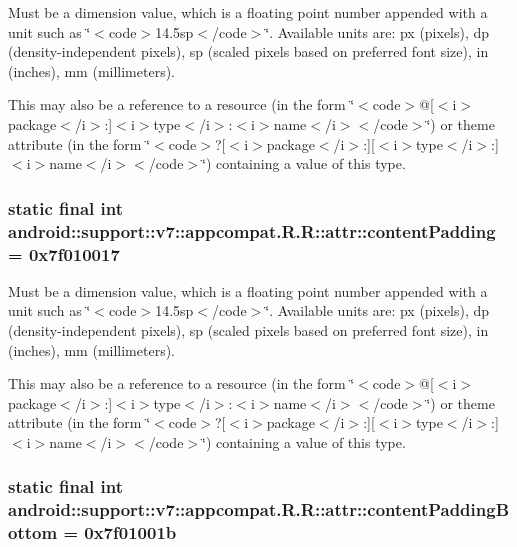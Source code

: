 Must be a dimension value, which is a floating point number appended with a unit such as \char`\"{}$<$code$>$14.5sp$<$/code$>$\char`\"{}. Available units are: px (pixels), dp (density-independent pixels), sp (scaled pixels based on preferred font size), in (inches), mm (millimeters). 

This may also be a reference to a resource (in the form \char`\"{}$<$code$>$@\mbox{[}$<$i$>$package$<$/i$>$:\mbox{]}$<$i$>$type$<$/i$>$:$<$i$>$name$<$/i$>$$<$/code$>$\char`\"{}) or theme attribute (in the form \char`\"{}$<$code$>$?\mbox{[}$<$i$>$package$<$/i$>$:\mbox{]}\mbox{[}$<$i$>$type$<$/i$>$:\mbox{]}$<$i$>$name$<$/i$>$$<$/code$>$\char`\"{}) containing a value of this type. \hypertarget{classandroid_1_1support_1_1v7_1_1appcompat_1_1_r_1_1attr_b21cc6fefb329f4e67d140c836cede25}{
\subsubsection[{contentPadding}]{\setlength{\rightskip}{0pt plus 5cm}static final int android::support::v7::appcompat.R.R::attr::contentPadding = 0x7f010017}}
\label{classandroid_1_1support_1_1v7_1_1appcompat_1_1_r_1_1attr_b21cc6fefb329f4e67d140c836cede25}


Must be a dimension value, which is a floating point number appended with a unit such as \char`\"{}$<$code$>$14.5sp$<$/code$>$\char`\"{}. Available units are: px (pixels), dp (density-independent pixels), sp (scaled pixels based on preferred font size), in (inches), mm (millimeters). 

This may also be a reference to a resource (in the form \char`\"{}$<$code$>$@\mbox{[}$<$i$>$package$<$/i$>$:\mbox{]}$<$i$>$type$<$/i$>$:$<$i$>$name$<$/i$>$$<$/code$>$\char`\"{}) or theme attribute (in the form \char`\"{}$<$code$>$?\mbox{[}$<$i$>$package$<$/i$>$:\mbox{]}\mbox{[}$<$i$>$type$<$/i$>$:\mbox{]}$<$i$>$name$<$/i$>$$<$/code$>$\char`\"{}) containing a value of this type. \hypertarget{classandroid_1_1support_1_1v7_1_1appcompat_1_1_r_1_1attr_83c13e0c0ea42b6b41e092a2805d4531}{
\subsubsection[{contentPaddingBottom}]{\setlength{\rightskip}{0pt plus 5cm}static final int android::support::v7::appcompat.R.R::attr::contentPaddingBottom = 0x7f01001b}}
\label{classandroid_1_1support_1_1v7_1_1appcompat_1_1_r_1_1attr_83c13e0c0ea42b6b41e092a2805d4531}


